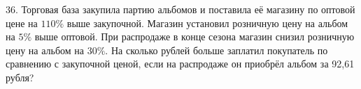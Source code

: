36. Торговая база закупила партию альбомов и поставила её магазину по оптовой цене на $110\%$ выше закупочной. Магазин установил розничную цену на альбом на $5\%$ выше оптовой. При распродаже в конце сезона магазин снизил розничную цену на альбом на $30\%.$ На сколько рублей больше заплатил покупатель по сравнению с закупочной ценой, если на распродаже он приобрёл альбом за 92,61 рубля?\\
